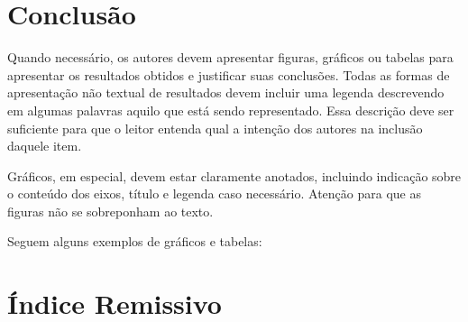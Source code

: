 \documentclass[12pt,a4paper]{report}
\begin{document}
\section*{Conclusão}

Quando necessário, os autores devem apresentar figuras, gráficos ou tabelas para apresentar os resultados obtidos e justificar suas conclusões. Todas as formas de apresentação não textual de resultados devem incluir uma legenda descrevendo em algumas palavras aquilo que está sendo representado. Essa descrição deve ser suficiente para que o leitor entenda qual a intenção dos autores na inclusão daquele item.

Gráficos, em especial, devem estar claramente anotados, incluindo indicação sobre o conteúdo dos eixos, título e legenda caso necessário. Atenção para que as figuras não se sobreponham ao texto.

Seguem alguns exemplos de gráficos e tabelas:

\section*{Índice Remissivo}
\end{document}

